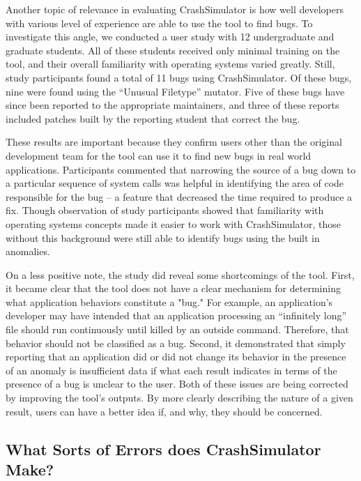 Another topic of relevance
in evaluating CrashSimulator
is how well developers with various level of experience are able to use the tool
to find bugs.
To investigate this angle,
we conducted a user study
with 12 undergraduate and graduate students.
All of these students received only minimal training on the tool, and their overall familiarity with operating systems varied greatly.
Still, study participants found a total of 11 bugs using CrashSimulator.
Of these bugs, nine were found using the ``Unusual Filetype'' mutator.
Five of these bugs have since been reported to the appropriate maintainers,
and three of these reports included patches built by the reporting student
that correct the bug.

These results are important
because they confirm
users other than the original development team for the tool
can use it to find new bugs in real world applications.
Participants commented that narrowing the source of a bug
down to a particular sequence of system calls
was helpful in identifying the area of
code responsible for the bug -- a feature
that decreased the time required to produce a fix.
Though observation of study participants
showed that familiarity with operating systems concepts
made it easier to work with CrashSimulator,
those without this background were still able to identify bugs using the
built in anomalies.


On a less positive note,
the study did reveal
some shortcomings
of the tool.
First,
it became clear that the tool
does not have a clear mechanism
for determining
what application behaviors constitute a "bug."
For example, an application's developer
may have intended that an application processing an ``infinitely long'' file should run continuously
until killed by an outside command.
Therefore, that behavior should not be classified as a bug.
Second,
it demonstrated that
simply reporting that an application did or did not change its behavior
in the presence of an anomaly is insufficient data
if  what each result indicates in terms of the presence of a bug is unclear to the user.
Both of these issues are being corrected
by improving the tool's outputs.
By more clearly describing
the nature of a given result,
users can have a better idea
if,
and why,
they should be concerned.


\subsection{What Sorts of Errors does CrashSimulator Make?}
\label{sec-sorts-errors}

